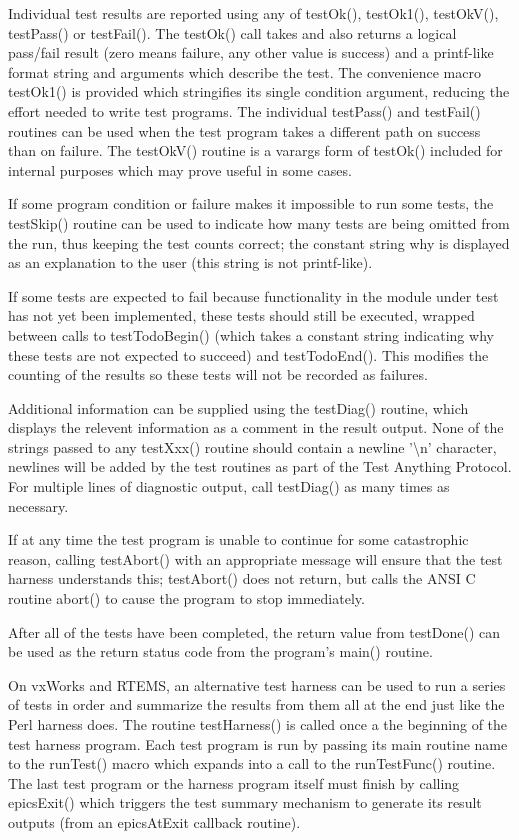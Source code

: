 Individual test results are reported using any of testOk(), testOk1(), testOkV(), testPass() or testFail(). The testOk() call 
takes and also returns a logical pass/fail result (zero means failure, any other value is success) and a printf-like format 
string and arguments which describe the test. The convenience macro testOk1() is provided which stringifies its single 
condition argument, reducing the effort needed to write test programs. The individual testPass() and testFail() routines can 
be used when the test program takes a different path on success than on failure. The testOkV() routine is a varargs form of 
testOk() included for internal purposes which may prove useful in some cases.

If some program condition or failure makes it impossible to run some tests, the testSkip() routine can be used to indicate 
how many tests are being omitted from the run, thus keeping the test counts correct; the constant string why is displayed 
as an explanation to the user (this string is not printf-like).

If some tests are expected to fail because functionality in the module under test has not yet been implemented, these tests 
should still be executed, wrapped between calls to testTodoBegin() (which takes a constant string indicating why these 
tests are not expected to succeed) and testTodoEnd(). This modifies the counting of the results so these tests will not be 
recorded as failures.

Additional information can be supplied using the testDiag() routine, which displays the relevent information as a 
comment in the result output. None of the strings passed to any testXxx() routine should contain a newline '\textbackslash{}n' character, 
newlines will be added by the test routines as part of the Test Anything Protocol.  For multiple lines of diagnostic output, 
call testDiag() as many times as necessary.

If at any time the test program is unable to continue for some catastrophic reason, calling testAbort() with an appropriate 
message will ensure that the test harness understands this; testAbort() does not return, but calls the ANSI C routine abort() 
to cause the program to stop immediately.

After all of the tests have been completed, the return value from testDone() can be used as the return status code from the 
program's main() routine.

On vxWorks and RTEMS, an alternative test harness can be used to run a series of tests in order and summarize the results 
from them all at the end just like the Perl harness does. The routine testHarness() is called once a the beginning of the test 
harness program. Each test program is run by passing its main routine name to the runTest() macro which expands into a 
call to the runTestFunc() routine. The last test program or the harness program itself must finish by calling epicsExit() 
which triggers the test summary mechanism to generate its result outputs (from an epicsAtExit callback routine).

